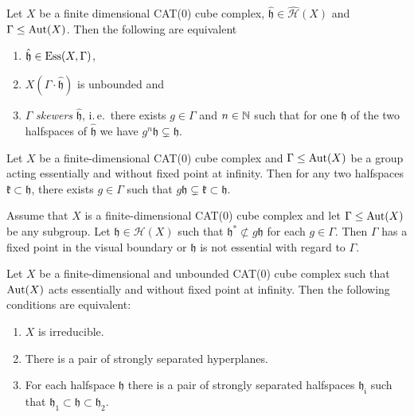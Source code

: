 \begin{lemma}
  \label{lem:ess-unbounded}
  Let \(X\) be a finite dimensional CAT(0) cube complex, \(\mathfrak{\hat h} \in \mathcal{\hat H}(X)\) and \(\Gamma \leq \operatorname{Aut}(X)\). Then the following are equivalent
  \begin{enumerate}
  \item \(\mathfrak{\hat h} \in \operatorname{Ess}(X,\Gamma)\),
  \item  \(X(\Gamma \cdot \mathfrak{\hat h})\) is unbounded and
  \item \(\Gamma\) \emph{skewers} \(\mathfrak{\hat h}\), i.\,e.\ there exists \(g \in \Gamma\) and \(n \in \mathbb{N}\) such that for one \(\mathfrak{h}\) of the two halfspaces of \(\mathfrak{\hat h}\) we have \(g^n \mathfrak{h} \subsetneq \mathfrak{h}\).
  \end{enumerate}
\end{lemma}

\begin{lemma}
  \label{lem:cs-dsl}
  Let \(X\) be a finite-dimensional CAT(0) cube complex and \(\Gamma \leq \operatorname{Aut}(X)\) be a group acting essentially and without fixed point at infinity. Then for any two halfspaces \(\mathfrak{k} \subset \mathfrak{h}\), there exists \(g \in \Gamma\) such that \(g \mathfrak{h} \subsetneq \mathfrak{k} \subset \mathfrak{h}\).
\end{lemma}

\begin{thm}
  \label{thm:cs-flipping}
  Assume that \(X\) is a finite-dimensional CAT(0) cube complex and let \(\Gamma \leq \operatorname{Aut}(X)\) be any subgroup. Let \(\mathfrak{h} \in \mathcal{H}(X)\) such that \(\mathfrak{h}^\ast \not\subset g\mathfrak{h}\) for each \(g \in \Gamma\). Then \(\Gamma\) has a fixed point in the visual boundary or \(\mathfrak{h}\) is not essential with regard to \(\Gamma\).
\end{thm}

\begin{prop}
  \label{prop:cs-5.1}
  Let \(X\) be a finite-dimensional and unbounded CAT(0) cube complex such that \(\operatorname{Aut}(X)\) acts essentially and without fixed point at infinity. Then the following conditions are equivalent:
  \begin{enumerate}
  \item \(X\) is irreducible.
  \item There is a pair of strongly separated hyperplanes.
  \item For each halfspace \(\mathfrak{h}\) there is a pair of strongly separated halfspaces \(\mathfrak{h_i}\) such that \(\mathfrak{h}_1 \subset \mathfrak{h} \subset \mathfrak{h}_2\).
  \end{enumerate}
\end{prop}


